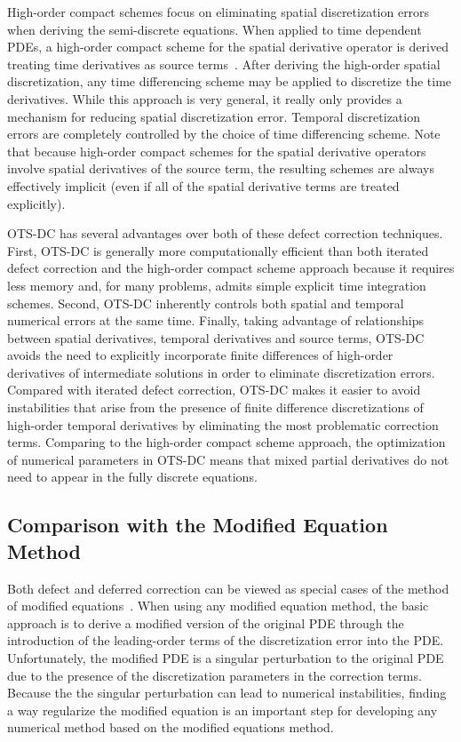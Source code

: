 \documentclass[fleqn,12pt,twoside]{article}
\begin{document}
High-order compact schemes focus on eliminating spatial discretization errors 
when deriving the semi-discrete equations.  When applied to time dependent 
PDEs, a high-order compact scheme for the spatial derivative operator is 
derived treating time derivatives as source 
terms~\cite{spotz_2001,ito_2005,heidenreich_2007}.  
After deriving the high-order spatial discretization, any time differencing 
scheme may be applied to discretize the time derivatives.  While this 
approach is very general, it really only provides a mechanism for reducing 
spatial discretization error.  Temporal discretization errors are completely 
controlled by the choice of time differencing scheme.  Note that because 
high-order compact schemes for the spatial derivative operators involve spatial 
derivatives of the source term, the resulting schemes are always effectively 
implicit (even if all of the spatial derivative terms are treated explicitly).  

OTS-DC has several advantages over both of these defect correction 
techniques.  First, OTS-DC is generally more computationally efficient than 
both iterated defect correction and the high-order compact scheme approach
because it requires less memory and, for many problems, admits simple 
explicit time integration schemes.  Second, OTS-DC inherently controls both 
spatial and temporal numerical errors at the same time.  Finally, taking
advantage of relationships between spatial derivatives, temporal derivatives
and source terms, OTS-DC avoids the need to explicitly incorporate finite
differences of high-order derivatives of intermediate solutions in order to
eliminate discretization errors. 
Compared with iterated defect correction, OTS-DC makes it easier to avoid
instabilities that arise from the presence of finite difference discretizations
of high-order temporal derivatives by eliminating the most problematic
correction terms.  Comparing to the high-order compact scheme approach, the
optimization of numerical parameters in OTS-DC means that mixed partial
derivatives do not need to appear in the fully discrete equations.


\subsection{Comparison with the Modified Equation Method}
Both defect and deferred correction can be viewed as special cases of the
method of modified equations~\cite{griffiths_1986}.  When using any modified
equation method, the basic approach is to derive a modified version of the 
original PDE through the introduction of the leading-order terms of the
discretization error into the PDE.  Unfortunately, the modified PDE is a
singular perturbation to the original PDE due to the presence of the
discretization parameters in the correction terms.  Because the the singular
perturbation can lead to numerical instabilities, finding a way regularize
the modified equation is an important step for developing any numerical method
based on the modified equations method. 
\end{document}

